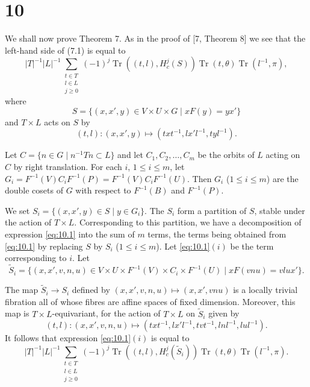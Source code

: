 \documentclass[12pt,a4paper]{article}
\theoremstyle{plain}
\theoremstyle{remark}
\DeclareMathOperator{\Tr}{Tr}
\begin{document}
\section*{10}

We shall now prove Theorem 7. As in the proof of [7, Theorem 8] we see that the left-hand side of (7.1) is equal to
\begin{equation}\label{eq:10.1}
|T|^{-1} |L|^{-1} \sum_{\substack{t \in T \\ l \in L \\ j \geq 0}} (-1)^j \Tr((t,l), H_c^j(S)) \Tr(t, \theta) \Tr(l^{-1}, \pi),
\end{equation}
where
\begin{equation*}
S = \{(x, x', y) \in V \times U \times G \mid xF(y) = yx'\}
\end{equation*}
and $T \times L$ acts on $S$ by
\begin{equation*}
(t,l) \colon (x,x',y) \mapsto (txt^{-1}, lx'l^{-1}, tyl^{-1}).
\end{equation*}

Let $C = \{n \in G \mid n^{-1}Tn \subset L\}$ and let $C_1, C_2, \dots, C_m$ be the orbits of $L$ acting on $C$ by right translation. For each $i$, $1 \leq i \leq m$, let $G_i = F^{-1}(V) C_i F^{-1}(P) = F^{-1}(V) C_i F^{-1}(U)$. Then $G_i$ ($1 \leq i \leq m$) are the double cosets of $G$ with respect to $F^{-1}(B)$ and $F^{-1}(P)$.

We set $S_i = \{(x,x',y) \in S \mid y \in G_i\}$. The $S_i$ form a partition of $S$, stable under the action of $T \times L$. Corresponding to this partition, we have a decomposition of expression \eqref{eq:10.1} into the sum of $m$ terms, the terms being obtained from \eqref{eq:10.1} by replacing $S$ by $S_i$ ($1 \leq i \leq m$). Let \eqref{eq:10.1}$(i)$ be the term corresponding to $i$. Let
\begin{equation*}
\tilde{S}_i = \{(x,x',v,n,u) \in V \times U \times F^{-1}(V) \times C_i \times F^{-1}(U) \mid xF(vnu) = vlux'\}.
\end{equation*}

The map $\tilde{S}_i \to S_i$ defined by $(x,x',v,n,u) \mapsto (x,x',vnu)$ is a locally trivial fibration all of whose fibres are affine spaces of fixed dimension. Moreover, this map is $T \times L$-equivariant, for the action of $T \times L$ on $\tilde{S}_i$ given by
\begin{equation}\label{eq:10.2}
(t,l) \colon (x,x',v,n,u) \mapsto (txt^{-1}, lx'l^{-1}, tvt^{-1}, lnl^{-1}, lul^{-1}).
\end{equation}
It follows that expression \eqref{eq:10.1}$(i)$ is equal to
\begin{equation}\label{eq:10.3}
|T|^{-1} |L|^{-1} \sum_{\substack{t \in T \\ l \in L \\ j \geq 0}} (-1)^j \Tr((t,l), H_c^j(\tilde{S}_i)) \Tr(t, \theta) \Tr(l^{-1}, \pi).
\end{equation}
\end{document}
